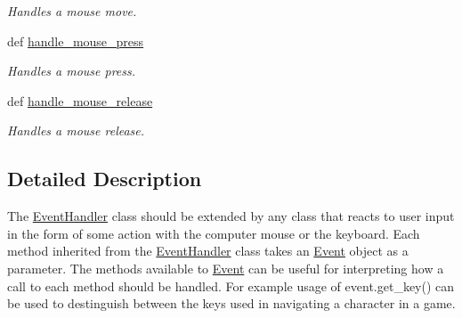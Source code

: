 \begin{DoxyCompactItemize}
\begin{DoxyCompactList}\small\item\em Handles a mouse move. \item\end{DoxyCompactList}\item 
def \hyperlink{classcs110graphics_1_1EventHandler_a547873123ebcd3fcc63a2e03d2a2fee3}{handle\_\-mouse\_\-press}
\begin{DoxyCompactList}\small\item\em Handles a mouse press. \item\end{DoxyCompactList}\item 
def \hyperlink{classcs110graphics_1_1EventHandler_a320a7dbf68d37e0101b237bff1713088}{handle\_\-mouse\_\-release}
\begin{DoxyCompactList}\small\item\em Handles a mouse release. \item\end{DoxyCompactList}\end{DoxyCompactItemize}


\subsection{Detailed Description}
The \hyperlink{classcs110graphics_1_1EventHandler}{EventHandler} class should be extended by any class that reacts to user input in the form of some action with the computer mouse or the keyboard. Each method inherited from the \hyperlink{classcs110graphics_1_1EventHandler}{EventHandler} class takes an \hyperlink{classcs110graphics_1_1Event}{Event} object as a parameter. The methods available to \hyperlink{classcs110graphics_1_1Event}{Event} can be useful for interpreting how a call to each method should be handled. For example usage of event.get\_\-key() can be used to destinguish between the keys used in navigating a character in a game.

